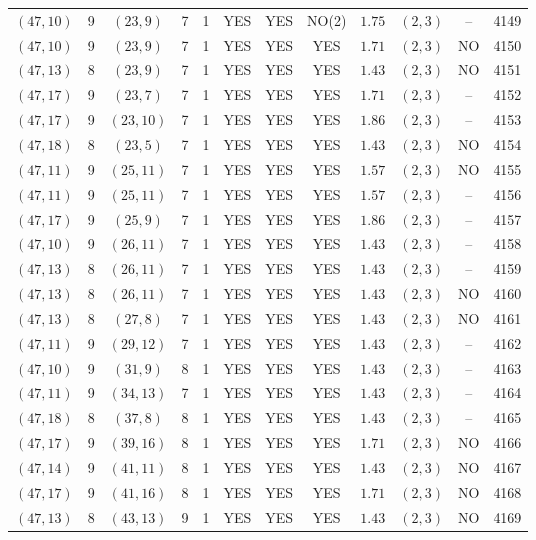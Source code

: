 \begin{longtable}{|c|c|c|c|c|c|c|c|c|c|c|c|}
$(47,10)$ & 9 & $(23,9)$ & 7 & 1 & YES & YES & NO(2) & $1.75$ & $(2,3)$ & -- & 4149\\
$(47,10)$ & 9 & $(23,9)$ & 7 & 1 & YES & YES & YES & $1.71$ & $(2,3)$ & NO & 4150\\
$(47,13)$ & 8 & $(23,9)$ & 7 & 1 & YES & YES & YES & $1.43$ & $(2,3)$ & NO & 4151\\
$(47,17)$ & 9 & $(23,7)$ & 7 & 1 & YES & YES & YES & $1.71$ & $(2,3)$ & -- & 4152\\
$(47,17)$ & 9 & $(23,10)$ & 7 & 1 & YES & YES & YES & $1.86$ & $(2,3)$ & -- & 4153\\
$(47,18)$ & 8 & $(23,5)$ & 7 & 1 & YES & YES & YES & $1.43$ & $(2,3)$ & NO & 4154\\
$(47,11)$ & 9 & $(25,11)$ & 7 & 1 & YES & YES & YES & $1.57$ & $(2,3)$ & NO & 4155\\
$(47,11)$ & 9 & $(25,11)$ & 7 & 1 & YES & YES & YES & $1.57$ & $(2,3)$ & -- & 4156\\
$(47,17)$ & 9 & $(25,9)$ & 7 & 1 & YES & YES & YES & $1.86$ & $(2,3)$ & -- & 4157\\
$(47,10)$ & 9 & $(26,11)$ & 7 & 1 & YES & YES & YES & $1.43$ & $(2,3)$ & -- & 4158\\
$(47,13)$ & 8 & $(26,11)$ & 7 & 1 & YES & YES & YES & $1.43$ & $(2,3)$ & -- & 4159\\
$(47,13)$ & 8 & $(26,11)$ & 7 & 1 & YES & YES & YES & $1.43$ & $(2,3)$ & NO & 4160\\
$(47,13)$ & 8 & $(27,8)$ & 7 & 1 & YES & YES & YES & $1.43$ & $(2,3)$ & NO & 4161\\
$(47,11)$ & 9 & $(29,12)$ & 7 & 1 & YES & YES & YES & $1.43$ & $(2,3)$ & -- & 4162\\
$(47,10)$ & 9 & $(31,9)$ & 8 & 1 & YES & YES & YES & $1.43$ & $(2,3)$ & -- & 4163\\
$(47,11)$ & 9 & $(34,13)$ & 7 & 1 & YES & YES & YES & $1.43$ & $(2,3)$ & -- & 4164\\
$(47,18)$ & 8 & $(37,8)$ & 8 & 1 & YES & YES & YES & $1.43$ & $(2,3)$ & -- & 4165\\
$(47,17)$ & 9 & $(39,16)$ & 8 & 1 & YES & YES & YES & $1.71$ & $(2,3)$ & NO & 4166\\
$(47,14)$ & 9 & $(41,11)$ & 8 & 1 & YES & YES & YES & $1.43$ & $(2,3)$ & NO & 4167\\
$(47,17)$ & 9 & $(41,16)$ & 8 & 1 & YES & YES & YES & $1.71$ & $(2,3)$ & NO & 4168\\
$(47,13)$ & 8 & $(43,13)$ & 9 & 1 & YES & YES & YES & $1.43$ & $(2,3)$ & NO & 4169\\

\end{longtable}
